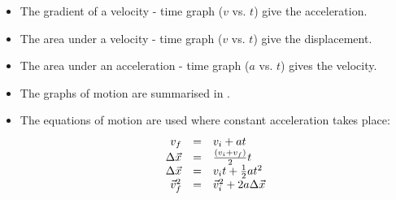 \begin{itemize}[noitemsep]
\label{m38796*uid167}\item The gradient of a velocity - time graph ($v$ vs. $t$) give the acceleration.
\label{m38796*uid168}\item The area under a velocity - time graph ($v$ vs. $t$) give the displacement.
\label{m38796*uid169}\item The area under an acceleration - time graph ($a$ vs. $t$) gives the velocity.
\label{m38796*uid170}\item The graphs of motion are summarised in .
\label{m38796*uid171}\item The equations of motion are used where constant acceleration takes place:
\label{m38796*id81101}\nopagebreak\noindent{}
    \begin{equation*}
    \begin{array}{ccc}\hfill {v}_{f}& =& {v}_{i}+at\hfill \\ \hfill \Delta \vec{x}& =& \frac{\left({v}_{i}+{v}_{f}\right)}{2}t\hfill \\ \hfill \Delta \vec{x}& =& {v}_{i}t+\frac{1}{2}a{t}^{2}\hfill \\ \hfill \vec{v}_{f}^{2}& =& \vec{v}_{i}^{2}+2a\Delta \vec{x}\hfill \end{array}
      \end{equation*}
    \end{itemize}

